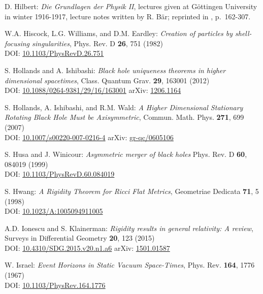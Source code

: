 \begin{thebibliography}{123}
D. Hilbert:
{\em Die Grundlagen der Physik II},
lectures given at Göttingen University in winter 1916-1917,
lecture notes written by R. Bär; reprinted
in \cite{SauerM09}, p.~162-307.

W.A. Hiscock, L.G. Williams, and D.M. Eardley:
{\em Creation of particles by shell-focusing singularities},
Phys. Rev. D {\bf 26}, 751 (1982)\\
DOI: \href{https://doi.org/10.1103/PhysRevD.26.751}{10.1103/PhysRevD.26.751}

S. Hollands and A. Ishibashi:
{\em Black hole uniqueness theorems in higher dimensional spacetimes},
Class. Quantum Grav. {\bf 29}, 163001 (2012)\\
DOI: \href{https://doi.org/10.1088/0264-9381/29/16/163001}{10.1088/0264-9381/29/16/163001}\hfill
arXiv: \href{https://arxiv.org/abs/1206.1164}{1206.1164}

S. Hollands, A. Ishibashi, and R.M. Wald:
{\em A Higher Dimensional Stationary Rotating Black Hole Must be Axisymmetric},
Commun. Math. Phys. {\bf 271}, 699 (2007)\\
DOI: \href{https://doi.org/10.1007/s00220-007-0216-4}{10.1007/s00220-007-0216-4}\hfill
arXiv: \href{https://arxiv.org/abs/gr-qc/0605106}{gr-qc/0605106}

S. Husa and J. Winicour:
{\em Asymmetric merger of black holes}
Phys. Rev. D {\bf 60}, 084019 (1999)\\
DOI: \href{https://doi.org/10.1103/PhysRevD.60.084019}{10.1103/PhysRevD.60.084019}

S. Hwang:
{\em A Rigidity Theorem for Ricci Flat Metrics},
Geometriae Dedicata {\bf 71}, 5 (1998)\\
DOI: \href{https://doi.org/10.1023/A:1005094911005}{10.1023/A:1005094911005}

A.D. Ionescu and S. Klainerman:
{\em Rigidity results in general relativity: A review},
Surveys in Differential Geometry {\bf 20}, 123 (2015)\\
DOI: \href{https://dx.doi.org/10.4310/SDG.2015.v20.n1.a6}{10.4310/SDG.2015.v20.n1.a6}\hfill
arXiv: \href{https://arxiv.org/abs/1501.01587}{1501.01587}

W. Israel: {\em Event Horizons in Static Vacuum Space-Times},
Phys. Rev. {\bf 164}, 1776 (1967)\\
DOI: \href{https://doi.org/10.1103/PhysRev.164.1776}{10.1103/PhysRev.164.1776}


\end{thebibliography}
